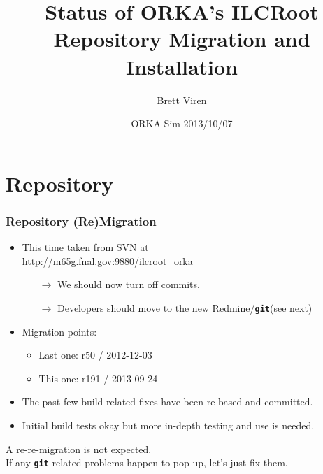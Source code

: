 \documentclass[xcolor=dvipsnames]{beamer}
\author[Brett Viren]{Brett Viren}
\title[ILCRoot]{Status of ORKA's ILCRoot \\ Repository Migration and Installation}
\date{ORKA Sim 2013/10/07}
\newcommand{\git}{\texttt{\textbf{git}}\xspace}
\begin{document}


\begin{frame}
  \titlepage
\end{frame}

\section{Repository}

\begin{frame}
  \frametitle{Repository (Re)Migration}

  \begin{itemize}
  \item This time taken from SVN at\\
    \url{http://m65g.fnal.gov:9880/ilcroot_orka}
    \begin{itemize}
    \item[$\rightarrow$] We should now turn off commits.
    \item[$\rightarrow$] Developers should move to the new Redmine/\git (see next)
    \end{itemize}
  \item Migration points:
    \begin{itemize}
    \item Last one: r50 / 2012-12-03
    \item This one: r191 / 2013-09-24
    \end{itemize}
  \item The past few build related fixes have been re-based and committed.
  \item Initial build tests okay but more in-depth testing and use is needed.
  \end{itemize}

  A re-re-migration is not expected.  \\
  If any \git-related problems
  happen to pop up, let's just fix them.

\end{frame}
\end{document}
